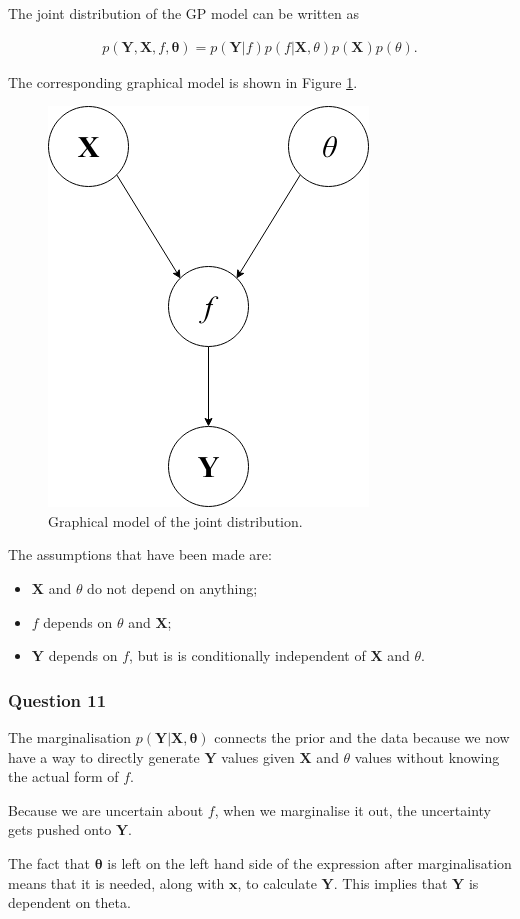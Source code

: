 \documentclass[10pt, a4paper, twocolumn]{article} %
\begin{document}
The joint distribution of the GP model can be written as

\begin{align}
  p(\mathbf{Y},\mathbf{X}, f, \mathbf{\theta}) = p(\mathbf{Y}|f)p(f|\mathbf{X},\theta)p(\mathbf{X})p(\theta).
\end{align}

The corresponding graphical model is shown in Figure \ref{fig:q10}.

\begin{figure}[htbp]
\centerline{\includegraphics[width=0.5\linewidth]{question_10.png}}
\caption{Graphical model of the joint distribution.}
\label{fig:q10}
\end{figure}

The assumptions that have been made are:

\begin{itemize}
\item $\mathbf{X}$ and $\theta$ do not depend on anything;
\item $f$ depends on $\theta$ and $\mathbf{X}$;
\item $\mathbf{Y}$ depends on $f$, but is is conditionally independent of $\mathbf{X}$ and $\theta$.
\end{itemize}

\subsubsection*{Question 11}

The marginalisation $p(\mathbf{Y|X,\theta})$ connects the prior and the data because we now have a way to directly generate $\mathbf{Y}$ values given $\mathbf{X}$ and $\theta$ values without knowing the actual form of $f$.
\par
Because we are uncertain about $f$, when we marginalise it out, the uncertainty gets pushed onto $\mathbf{Y}$.
\par
The fact that $\mathbf{\theta}$ is left on the left hand side of the expression after marginalisation means that it is needed, along with $\mathbf{x}$, to calculate $\mathbf{Y}$. This implies that $\mathbf{Y}$ is dependent on theta.
\end{document}
